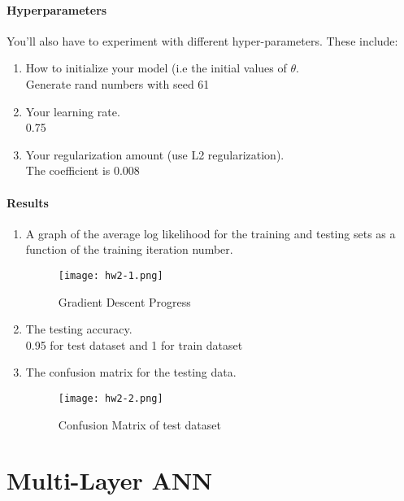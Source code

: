 \documentclass[12pt]{article}
\begin{document}
\paragraph{Hyperparameters}
You'll also have to experiment with different hyper-parameters.  These include:
\begin{enumerate}
\item How to initialize your model (i.e the initial values of $\theta$.\\
Generate rand numbers with seed 61
\item Your learning rate.\\
0.75
\item Your regularization amount (use L2 regularization).\\
The coefficient is 0.008
\end{enumerate}


\paragraph{Results}
\begin{enumerate}
\item A graph of the average log likelihood for the training and testing sets as a function of the training iteration number.
\begin{figure}[H]
\begin{center}
\texttt{[image: hw2-1.png]}
\caption{Gradient Descent Progress}
\end{center}
\end{figure}
\item The testing accuracy.\\
0.95 for test dataset and 1 for train dataset
\item The confusion matrix for the testing data.
\begin{figure}[H]
\begin{center}
\texttt{[image: hw2-2.png]}
\caption{Confusion Matrix of test dataset}
\end{center}
\end{figure}
\end{enumerate}


\newpage
\section{Multi-Layer ANN}
\end{document}
